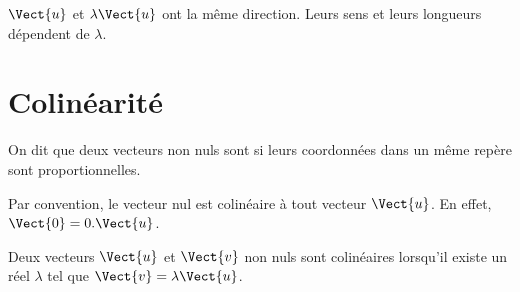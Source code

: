 \documentclass{book}
\begin{document}
\begin{Remarque}
 $\Vect{u}$ et $\lambda \Vect{u}$ ont la même direction.  Leurs sens et leurs longueurs dépendent de $\lambda$.
\end{Remarque}


\section{Colinéarité}


\begin{Definition}[Colinéaire]
On dit que deux vecteurs non nuls sont  si  leurs coordonnées dans un même repère sont proportionnelles. 
\end{Definition}

 \begin{Remarque}
Par convention, le vecteur nul est colinéaire à tout vecteur $\Vect{u}$. En effet, $\Vect{0}=0.\Vect{u}$.
 \end{Remarque}



\begin{Proposition}
Deux vecteurs $\Vect{u}$ et $\Vect{v}$ non nuls sont colinéaires lorsqu'il existe un réel $\lambda$ tel que $\Vect{v}=\lambda\Vect{u}$.
\end{Proposition}
 
\end{document}
